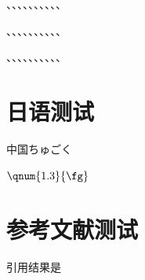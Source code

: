 、、、、、、、、、、

、、、、、、、、、、

、、、、、、、、、、

\section{日语测试}
中国ちゅごく


$\qnum{1.3}{\fg}$

\section{参考文献测试}
引用结果是\cite{2021-Bozorg-00245GHzLNTA28nm,2021-Liu-0061mm2111GHzNoiseCanceling}